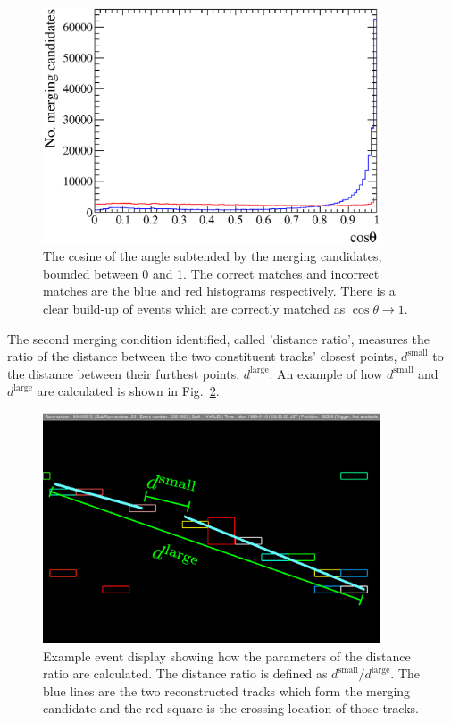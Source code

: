 \begin{figure}[!t]
  \centering
  \includegraphics[width=10cm]{images/selection/vertex_recon/merging_candidates_cos_theta}
  \caption{The cosine of the angle subtended by the merging candidates, bounded between 0 and 1. The correct matches and incorrect matches are the blue and red histograms respectively.  There is a clear build-up of events which are correctly matched as $\cos\theta \to 1$.}
  \label{fig:TrackMergingConditionCosTheta}
\end{figure}
\newline
\newline
The second merging condition identified, called 'distance ratio', measures the ratio of the distance between the two constituent tracks' closest points, $d^{\textrm{small}}$ to the distance between their furthest points, $d^{\textrm{large}}$.  An example of how $d^{\textrm{small}}$ and $d^{\textrm{large}}$ are calculated is shown in Fig.~\ref{fig:DistanceRatioEventDisplay}.    
\begin{figure}[!b]
  \centering
  \includegraphics[width=10cm]{images/selection/vertex_recon/distance_ratio_event_display}
  \caption{Example event display showing how the parameters of the distance ratio are calculated.  The distance ratio is defined as $d^{\textrm{small}}/d^{\textrm{large}}$.  The blue lines are the two reconstructed tracks which form the merging candidate and the red square is the crossing location of those tracks.}
  \label{fig:DistanceRatioEventDisplay}
\end{figure}
